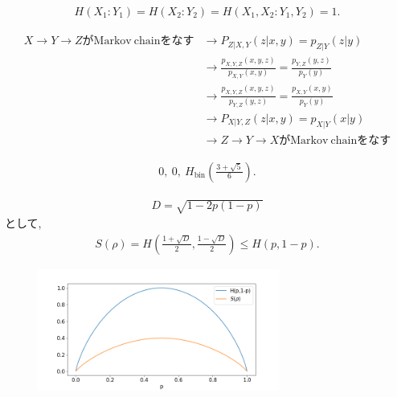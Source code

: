 \begin{ex}
    \label{ex11.9}
    \begin{align*}
        H(X_1 : Y_1) = H(X_2 : Y_2) =  H(X_1, X_2 : Y_1, Y_2) = 1.
    \end{align*}
\end{ex}

\begin{ex}
    \label{ex11.10}
    \begin{align*}
        X \to Y \to Z \mathrm{がMarkov\ chainをなす}
         & \longrightarrow
        P_{Z|X,Y}(z|x,y) = p_{Z|Y}(z|y)                                       \\
         & \longrightarrow
        \frac{p_{X,Y,Z}(x,y,z)}{p_{X,Y}(x,y)} = \frac{p_{Y,Z}(y,z)}{p_{Y}(y)} \\
         & \longrightarrow
        \frac{p_{X,Y,Z}(x,y,z)}{p_{Y,Z}(y,z)} = \frac{p_{X,Y}(x,y)}{p_{Y}(y)} \\
         & \longrightarrow
        P_{X|Y,Z}(z|x,y) = p_{X|Y}(x|y)                                       \\
         & \longrightarrow
        Z \to Y \to X \mathrm{がMarkov\ chainをなす}
    \end{align*}
\end{ex}

\begin{ex}
    \label{ex11.11}
    \begin{align*}
        0,\ 0, \ H_{\text{bin}}\left( \frac{3 + \sqrt{5}}{6}\right).
    \end{align*}
\end{ex}

\begin{ex}
    \label{ex11.12}
    \begin{align*}
        D = \sqrt{1-2p(1-p)}
    \end{align*}
    として,
    \begin{align*}
        S\left( \rho\right) = H\left( \frac{1 + \sqrt{D}}{2}, \frac{1 - \sqrt{D}}{2}\right) \leq H(p,1-p).
    \end{align*}
    \begin{figure}[H]
        \begin{center}
            \includegraphics[width = 80mm]{../fig/ex11_12.png}
        \end{center}
    \end{figure}
\end{ex}

